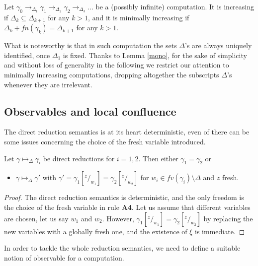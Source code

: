 \documentclass{llncs}
\begin{document}
\begin{definition}\label{def:min}
Let $\gamma_0  \rightarrow_{\Delta_1} \gamma_1  \rightarrow_{\Delta_2} \gamma_2 \rightarrow_{\Delta_3} \dots$ be a
(possibly infinite) computation. 
It is increasing if $\Delta_k \subseteq \Delta_{k+1}$ for any $k >1$, and
it is minimally increasing if $\Delta_k + fn(\gamma_k) = \Delta_{k+1}$ for any $k>1$.
\end{definition}

What is noteworthy is that in such computation the sets $\Delta$'s are always uniquely identified,
once $\Delta_1$ is fixed.
Thanks to Lemma \ref{mono}, for the sake of simplicity and without loss of generality 
in the following we restrict our attention to minimally increasing computations, dropping
altogether the subscripts $\Delta$'s whenever they are irrelevant.

\subsection{Observables and local confluence}
The direct reduction semantics is at its heart deterministic, even of there can be some issues concerning the choice of the fresh variable introduced.

\begin{lemma}\label{lemma:uptoD}
Let $\gamma \mapsto_\Delta \gamma_i$ be direct reductions for $i =  1, 2$.
Then either $\gamma_1 = \gamma_2$ or
\begin{itemize}
\item $\gamma \mapsto_\Delta \gamma'$ with 
$\gamma' = \gamma_1[^z/_{w_1}] =  \gamma_2[^z/_{w_2}]$
for $w_i \in fv(\gamma_i) \setminus \Delta$ and $z$ fresh.
\end{itemize}
\end{lemma}

\begin{proof}
The direct reduction semantics is deterministic, and the only freedom is the choice 
of the fresh variable in rule {\bf A4}. 
Let us assume that  different variables are chosen, let us say $w_1$ and $w_2$.
However, $\gamma_1[^z/_{w_1}] =  \gamma_2[^z/_{w_2}]$ by replacing the new variables 
with a globally fresh one, and the existence of $\xi$ is immediate.
\end{proof}

In order to tackle the whole reduction semantics, we need to define a suitable notion of observable for a computation.
\end{document}
